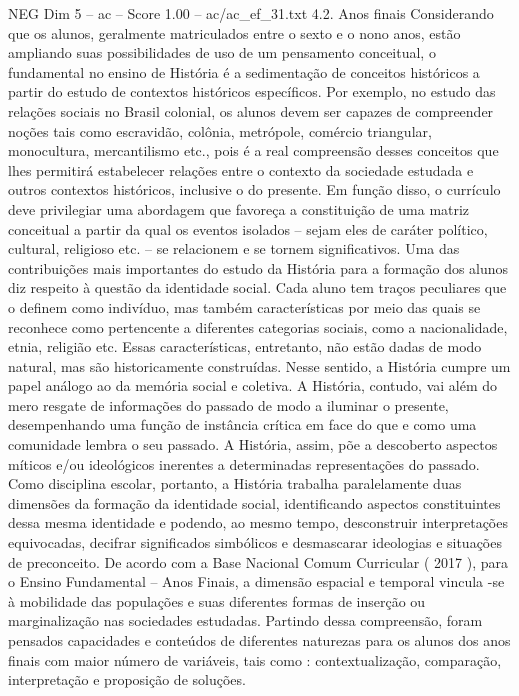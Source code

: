 \begin{textsample}{NEG Dim 5 – ac – Score 1.00 – ac/ac\_ef\_31.txt}  \label{ex:f5_neg_170}
4.2.
Anos finais Considerando que os alunos, geralmente matriculados entre o sexto e o nono anos, estão ampliando suas possibilidades de uso de um pensamento conceitual, o fundamental no ensino de História é a sedimentação de conceitos históricos a partir do estudo de contextos históricos específicos.
Por exemplo, no estudo das relações sociais no Brasil colonial, os alunos devem ser capazes de compreender noções tais como escravidão, colônia, metrópole, comércio triangular, monocultura, mercantilismo etc., pois é a real compreensão desses conceitos que lhes permitirá estabelecer relações entre o contexto da sociedade estudada e outros contextos históricos, inclusive o do presente.
Em função disso, o currículo deve privilegiar uma abordagem que favoreça a constituição de uma matriz conceitual a partir da qual os eventos isolados – sejam eles de caráter político, cultural, religioso etc. – se relacionem e se tornem significativos.
Uma das contribuições mais importantes do estudo da História para a formação dos alunos diz respeito à questão da identidade social.
Cada aluno tem traços peculiares que o definem como indivíduo, mas também características por meio das quais se reconhece como pertencente a diferentes categorias sociais, como a nacionalidade, etnia, religião etc.
Essas características, entretanto, não estão dadas de modo natural, mas são historicamente construídas.
Nesse sentido, a História cumpre um papel análogo ao da memória social e coletiva.
A História, contudo, vai além do mero resgate de informações do passado de modo a iluminar o presente, desempenhando uma função de instância crítica em face do que e como uma comunidade lembra o seu passado.
A História, assim, põe a descoberto aspectos míticos e/ou ideológicos inerentes a determinadas representações do passado.
Como disciplina escolar, portanto, a História trabalha paralelamente duas dimensões da formação da identidade social, identificando aspectos constituintes dessa mesma identidade e podendo, ao mesmo tempo, desconstruir interpretações equivocadas, decifrar significados simbólicos e desmascarar ideologias e situações de preconceito.
De acordo com a Base Nacional Comum Curricular ( 2017 ), para o Ensino Fundamental – Anos Finais, a dimensão espacial e temporal vincula -se à mobilidade das populações e suas diferentes formas de inserção ou marginalização nas sociedades estudadas.
Partindo dessa compreensão, foram pensados capacidades e conteúdos de diferentes naturezas para os alunos dos anos finais com maior número de variáveis, tais como : contextualização, comparação, interpretação e proposição de soluções.

\end{textsample}
